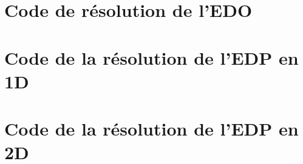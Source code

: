 \documentclass[11pt]{article}
\begin{document}
\fi


\begin{appendices}
\chapter{Code de résolution de l'EDO}

\chapter{Code de la résolution de l'EDP en 1D}

\chapter{Code de la résolution de l'EDP en 2D}

\end{appendices} 


\ifdefined\COMPLETE
\else
\end{document}

